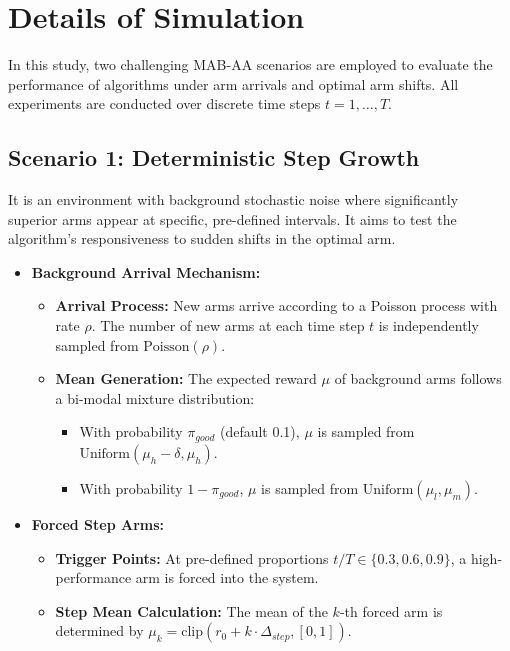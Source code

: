 \documentclass[11pt]{article}
\begin{document}
\section{Details of Simulation}


In this study, two challenging MAB-AA scenarios are employed to evaluate the performance of algorithms under arm arrivals and optimal arm shifts. All experiments are conducted over discrete time steps $t = 1, \dots, T$.


\subsection{Scenario 1: Deterministic Step Growth}
It is an environment with background stochastic noise where significantly superior arms appear at specific, pre-defined intervals. It aims to test the algorithm's responsiveness to sudden shifts in the optimal arm.

\begin{itemize}
    \item \textbf{Background Arrival Mechanism:} 
    \begin{itemize}
        \item \textbf{Arrival Process:} New arms arrive according to a Poisson process with rate $\rho$. The number of new arms at each time step $t$ is independently sampled from $\text{Poisson}(\rho)$.
        \item \textbf{Mean Generation:} The expected reward $\mu$ of background arms follows a bi-modal mixture distribution:
        \begin{itemize}
            \item With probability $\pi_{good}$ (default 0.1), $\mu$ is sampled from $\text{Uniform}(\mu_h - \delta, \mu_h)$.
            \item With probability $1 - \pi_{good}$, $\mu$ is sampled from $\text{Uniform}(\mu_l, \mu_m)$.

        \end{itemize}
    \end{itemize}
    \item \textbf{Forced Step Arms:} 
    \begin{itemize}
        \item \textbf{Trigger Points:} At pre-defined proportions $t/T \in \{0.3, 0.6, 0.9\}$, a high-performance arm is forced into the system.
        \item \textbf{Step Mean Calculation:} The mean of the $k$-th forced arm is determined by $\mu_k = \text{clip}(r_0 + k \cdot \Delta_{step}, [0, 1])$.
    
    \end{itemize}
\end{itemize}
\end{document}
